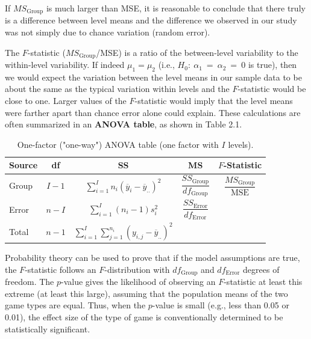 \documentclass[
]{report}
\begin{document}
If \(\scriptstyle MS_{\text{Group}}\) is much larger than MSE, it is reasonable to conclude that there truly is a difference between level means and the difference we observed in our study was not simply due to chance variation (random error).

The \(\scriptstyle F\)-statistic (\(\scriptstyle MS_{\text{Group}}\)/MSE) is a ratio of the between-level variability to the within-level variability. If indeed \(\scriptstyle \mu_1 = \mu_2\) (i.e., \(\scriptstyle H_0:\  \alpha_1 \ =\  \alpha_2 \ =\  0\) is true), then we would expect the variation between the level means in our sample data to be about the same as the typical variation within levels and the \(\scriptstyle F\)-statistic would be close to one. Larger values of the \(\scriptstyle F\)-statistic would imply that the level means were farther apart than chance error alone could explain. These calculations are often summarized in an \textbf{ANOVA table}, as shown in Table 2.1.

\begin{table}[!h]
\centering
\caption{\label{tab:tab2}One-factor ("one-way") ANOVA table (one factor with $I$ levels).}
\centering
\begin{tabular}[t]{lcccc}
\toprule
Source & df & SS & MS & $F$-Statistic\\
\midrule
Group & $I-1$ & $\displaystyle\sum_{i=1}^{I} n_i (\overline{y}_i - \overline{y}_{..})^2$ & $\dfrac{SS_{\text{Group}}}{df_{\text{Group}}}$ & $\dfrac{MS_{\text{Group}}}{\text{MSE}}$\\
Error & $n-I$ & $\displaystyle\sum_{i=1}^{I} (n_i-1)s_i^2$ & $\dfrac{SS_{\text{Error}}}{df_{\text{Error}}}$ & \\
Total & $n-1$ & $\displaystyle\sum_{i=1}^I \sum_{j=1}^{n_i} (y_{i,j} - \overline{y}_{..})^2$ &  & \\
\bottomrule
\end{tabular}
\end{table}

Probability theory can be used to prove that if the model assumptions are true, the \(\scriptstyle F\)-statistic follows an \(\scriptstyle F\)-distribution with \(\scriptstyle df_{\text{Group}}\) and \(\scriptstyle df_{\text{Error}}\) degrees of freedom. The \(\scriptstyle p\)-value gives the likelihood of observing an \(\scriptstyle F\)-statistic at least this extreme (at least this large), assuming that the population means of the two game types are equal. Thus, when the \(\scriptstyle p\)-value is small (e.g., less than 0.05 or 0.01), the effect size of the type of game is conventionally determined to be statistically significant.
\end{document}
